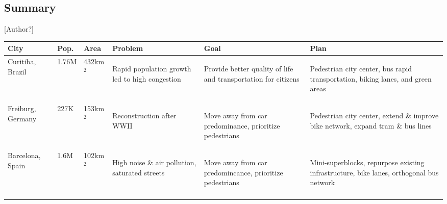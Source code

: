 \documentclass[12pt]{article}                         %
\begin{document}
\subsection{Summary}[Author?]
\begin{table}[h]
    \centering
    \small
    \begin{tabular}{ m{1.7cm} | m{1.1cm} | m{1.3cm} | m{3.4cm} | m{3.4cm} | m{3.4cm} }
        \textbf{City} & \textbf{Pop.} & \textbf{Area} & \textbf{Problem} & \textbf{Goal} & \textbf{Plan} \\
        \hline{}
        Curitiba, Brazil &
        1.76M &
        432km$^2$ &
        \begin{flushleft}Rapid population growth led to high congestion \end{flushleft} &
        \begin{flushleft}Provide better quality of life and transportation for citizens\end{flushleft} &
        \begin{flushleft}Pedestrian city center, bus rapid transportation, biking lanes, and green areas\end{flushleft} \\ 
        \hline{}
        
        Freiburg, Germany &
        227K &
        153km$^2$ &
        \begin{flushleft}Reconstruction after WWII \end{flushleft} &
        \begin{flushleft}Move away from car predominance, prioritize pedestrians\end{flushleft} &
        \begin{flushleft}Pedestrian city center, extend \& improve bike network, expand tram \& bus lines\end{flushleft} \\
        \hline{}
        
        Barcelona, Spain &
        1.6M &
        102km$^2$ &
        \begin{flushleft}High noise \& air pollution, saturated streets\end{flushleft} &
        \begin{flushleft}Move away from car predomincance, prioritize pedestrians\end{flushleft} &
        \begin{flushleft}Mini-superblocks, repurpose existing infrastructure, bike lanes, orthogonal bus network\end{flushleft} \\
        \hline{}
        

\end{tabular}
\end{table}
\end{document}
